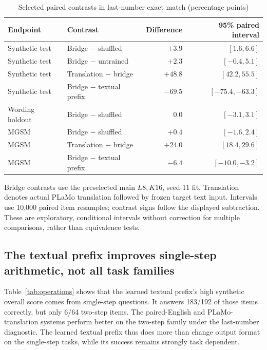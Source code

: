 \begin{table}[htbp]
\caption{Selected paired contrasts in last-number exact match (percentage points)}
\label{tab:contrasts}
\centering\small\sffamily
\begin{tabular}{@{}llrr@{}}
\toprule
Endpoint & Contrast & Difference & 95\% paired interval \\
\midrule
Synthetic test & Bridge $-$ shuffled & $+3.9$ & $[1.6,6.6]$ \\
Synthetic test & Bridge $-$ untrained & $+2.3$ & $[-0.4,5.1]$ \\
Synthetic test & Translation $-$ bridge & $+48.8$ & $[42.2,55.5]$ \\
Synthetic test & Bridge $-$ textual prefix & $-69.5$ & $[-75.4,-63.3]$ \\
Wording holdout & Bridge $-$ shuffled & $0.0$ & $[-3.1,3.1]$ \\
MGSM & Bridge $-$ shuffled & $+0.4$ & $[-1.6,2.4]$ \\
MGSM & Translation $-$ bridge & $+24.0$ & $[18.4,29.6]$ \\
MGSM & Bridge $-$ textual prefix & $-6.4$ & $[-10.0,-3.2]$ \\
\bottomrule
\end{tabular}
\par\smallskip\footnotesize
Bridge contrasts use the preselected main $L8,K16$, seed-11 fit.
Translation denotes actual PLaMo translation followed by frozen target text input.
Intervals use 10,000 paired item resamples; contrast signs follow the displayed
subtraction. These are exploratory, conditional intervals without correction for
multiple comparisons, rather than equivalence tests.
\end{table}

\subsection{The textual prefix improves single-step arithmetic, not all task families}

Table~\ref{tab:operations} shows that the learned textual prefix's high synthetic
overall score comes from single-step questions.
It answers 183/192 of those items correctly, but only 6/64 two-step items.
The paired-English and PLaMo-translation systems perform better on the two-step
family under the last-number diagnostic.
The learned textual prefix thus does more than change output format on the
single-step tasks, while its success remains strongly task dependent.

